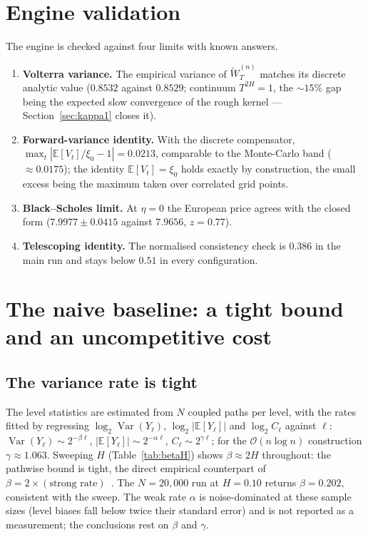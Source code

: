 \documentclass[11pt]{article}
\newcommand{\VarWe}{0.8532}
\newcommand{\VarWd}{0.8529}
\newcommand{\fwdv}{0.0213}
\newcommand{\fwdn}{0.0175}
\newcommand{\eurMC}{7.9977}
\newcommand{\eurSE}{0.0415}
\newcommand{\eurBS}{7.9656}
\newcommand{\zbs}{0.77}
\newcommand{\telcons}{0.386}
\newcommand{\bBmain}{0.202}
\newcommand{\gammaval}{1.063}
\begin{document}
\section{Engine validation}
\label{sec:validation}

The engine is checked against four limits with known answers.
\begin{enumerate}
\item \textbf{Volterra variance.} The empirical variance of $\widetilde{W}^{(n)}_{T}$
matches its discrete analytic value ($\VarWe$ against $\VarWd$; continuum $T^{2H}=1$, the
$\sim15\%$ gap being the expected slow convergence of the rough kernel ---
Section~\ref{sec:kappa1} closes it).
\item \textbf{Forward-variance identity.} With the discrete compensator,
$\max_t|\mathbb{E}[V_t]/\xi_0-1|=\fwdv$, comparable to the Monte-Carlo band
($\approx\fwdn$); the identity $\mathbb{E}[V_t]=\xi_0$ holds exactly by construction, the
small excess being the maximum taken over correlated grid points.
\item \textbf{Black--Scholes limit.} At $\eta=0$ the European price agrees with the closed
form ($\eurMC\pm\eurSE$ against $\eurBS$, $z=\zbs$).
\item \textbf{Telescoping identity.} The normalised consistency check is $\telcons$ in the
main run and stays below $0.51$ in every configuration.
\end{enumerate}

\section{The naive baseline: a tight bound and an uncompetitive cost}
\label{sec:baseline}

\subsection{The variance rate is tight}
The level statistics are estimated from $N$ coupled paths per level, with the rates fitted
by regressing $\log_2\operatorname{Var}(Y_\ell)$, $\log_2|\mathbb{E}[Y_\ell]|$ and
$\log_2 C_\ell$ against $\ell$: $\operatorname{Var}(Y_\ell)\sim 2^{-\beta\ell}$,
$|\mathbb{E}[Y_\ell]|\sim 2^{-\alpha\ell}$, $C_\ell\sim 2^{\gamma\ell}$; for the
$\mathcal{O}(n\log n)$ construction $\gamma\approx\gammaval$. Sweeping $H$
(Table~\ref{tab:betaH}) shows $\beta\approx2H$ throughout: the pathwise bound is tight, the
direct empirical counterpart of $\beta=2\times(\text{strong rate})$~\cite{bfrs2016}. The
$N=20{,}000$ run at $H=0.10$ returns $\beta=\bBmain$, consistent with the sweep. The weak
rate $\alpha$ is noise-dominated at these sample sizes (level biases fall below twice their
standard error) and is not reported as a measurement; the conclusions rest on $\beta$ and
$\gamma$.
\end{document}
